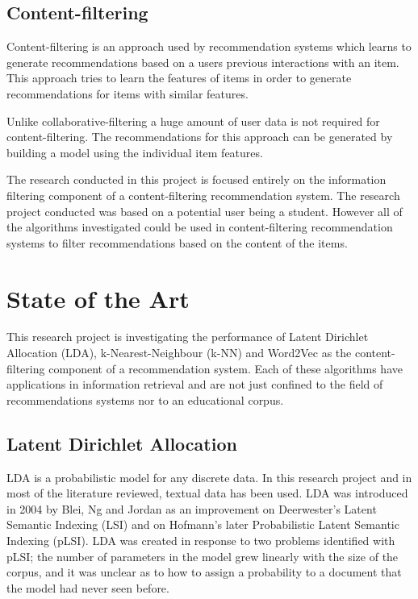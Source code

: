 \subsection{Content-filtering}
Content-filtering is an approach used by recommendation systems which learns to generate recommendations based on a users previous interactions with an item.
This approach tries to learn the features of items in order to generate recommendations for items with similar features\cite{recHandbookIntro}.

Unlike collaborative-filtering a huge amount of user data is not required for content-filtering.
The recommendations for this approach can be generated by building a model using the individual item features.

The research conducted in this project is focused entirely on the information filtering component of a content-filtering recommendation system.
The research project conducted was based on a potential user being a student.
However all of the algorithms investigated could be used in content-filtering recommendation systems to filter recommendations based on the content of the items.

\section{State of the Art}
This research project is investigating the performance of Latent Dirichlet Allocation (LDA), k-Nearest-Neighbour (k-NN) and Word2Vec as the content-filtering component of a recommendation system.
Each of these algorithms have applications in information retrieval and are not just confined to the field of recommendations systems nor to an educational corpus.

\subsection{Latent Dirichlet Allocation}
LDA is a probabilistic model for any discrete data. In this research project and in most of the literature reviewed, textual data has been used.
LDA was introduced in 2004 by Blei, Ng and Jordan as an improvement on Deerwester's Latent Semantic Indexing (LSI) and on Hofmann's later Probabilistic Latent Semantic Indexing (pLSI).
LDA was created in response to two problems identified with pLSI; the number of parameters in the model grew linearly with the size of the corpus, and it was unclear as to how to assign a probability to a document that the model had never seen before\cite{LDAintro}.

